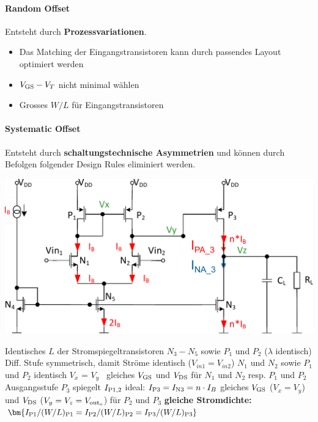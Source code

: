 \paragraph{Random Offset}
Entsteht durch \textbf{Prozessvariationen}.
\begin{itemize}
    \item Das Matching der Eingangstransistoren kann durch passendes Layout optimiert werden
    \item $V_{\rm GS} - V_T$ nicht minimal wählen
    \item Grosses $W/L$ für Eingangstransistoren
\end{itemize}


\paragraph{Systematic Offset}
Entsteht durch \textbf{schaltungstechnische Asymmetrien} und können durch Befolgen folgender Design Rules eliminiert werden.

\vspace{-0.2cm}

\begin{center}
    \includegraphics[width=0.8\columnwidth, align=t]{images/09_offset.pdf}
\end{center}

\begin{outline}
    \1 Identisches $L$ der Stromspiegeltransistoren $N_3 - N_5$ sowie $P_1$ und $P_2$ ($\lambda$ identisch)
    \1 Diff. Stufe symmetrisch, damit Ströme identisch ($V_{in1} = V_{in2}$)
        \2 $N_1$ und $N_2$ sowie $P_1$ und $P_2$ identisch
        \2 $V_x$ = $V_y$ \textrightarrow\ gleiches $V_{\rm GS}$ und $V_{\rm DS}$ für $N_1$ und $N_2$ resp. $P_1$ und $P_2$
    \1 Ausgangsstufe $P_3$ spiegelt $I_{\rm P1,2}$ ideal: $I_{\rm P3} = I_{\rm N3} = n \cdot I_B$
        \2 gleiches $V_{\rm GS}$ ($V_x = V_y$) und $V_{\rm DS}$ ($V_y = V_z = V_{\rm out_o}$) für $P_2$ und $P_3$
        \2 \textbf{gleiche Stromdichte:} $\bm{I_{\rm P1} / (W/L)_{\rm P1} = I_{\rm P2} / (W/L)_{\rm P2} = I_{\rm P3} / (W/L)_{\rm P3} }$
\end{outline}

